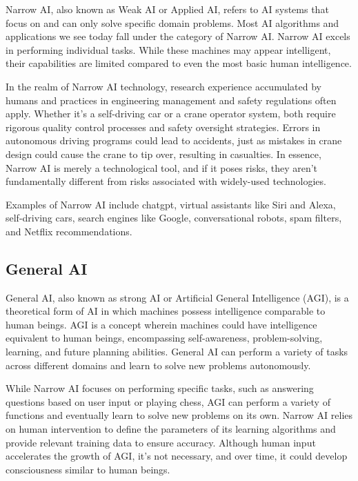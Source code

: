 \documentclass[
]{book}
\begin{document}
Narrow AI, also known as Weak AI or Applied AI, refers to AI systems that focus on and can only solve specific domain problems. Most AI algorithms and applications we see today fall under the category of Narrow AI. Narrow AI excels in performing individual tasks. While these machines may appear intelligent, their capabilities are limited compared to even the most basic human intelligence.

In the realm of Narrow AI technology, research experience accumulated by humans and practices in engineering management and safety regulations often apply. Whether it's a self-driving car or a crane operator system, both require rigorous quality control processes and safety oversight strategies. Errors in autonomous driving programs could lead to accidents, just as mistakes in crane design could cause the crane to tip over, resulting in casualties. In essence, Narrow AI is merely a technological tool, and if it poses risks, they aren't fundamentally different from risks associated with widely-used technologies.

Examples of Narrow AI include chatgpt, virtual assistants like Siri and Alexa, self-driving cars, search engines like Google, conversational robots, spam filters, and Netflix recommendations.

\hypertarget{general-ai}{%
\subsection{General AI}\label{general-ai}}

General AI, also known as strong AI or Artificial General Intelligence (AGI), is a theoretical form of AI in which machines possess intelligence comparable to human beings. AGI is a concept wherein machines could have intelligence equivalent to human beings, encompassing self-awareness, problem-solving, learning, and future planning abilities. General AI can perform a variety of tasks across different domains and learn to solve new problems autonomously.

While Narrow AI focuses on performing specific tasks, such as answering questions based on user input or playing chess, AGI can perform a variety of functions and eventually learn to solve new problems on its own. Narrow AI relies on human intervention to define the parameters of its learning algorithms and provide relevant training data to ensure accuracy. Although human input accelerates the growth of AGI, it's not necessary, and over time, it could develop consciousness similar to human beings.
\end{document}
